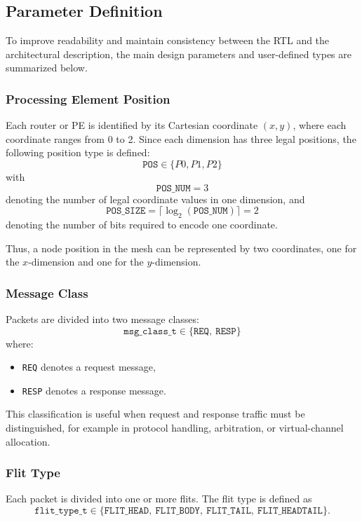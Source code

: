 \documentclass[11pt,a4paper]{article}
\begin{document}
\subsection{Parameter Definition}
\label{subsec:parameter_definition}

To improve readability and maintain consistency between the RTL and the architectural description, the main design parameters and user-defined types are summarized below.

\subsubsection*{Processing Element Position}
Each router or PE is identified by its Cartesian coordinate \((x,y)\), where each coordinate ranges from 0 to 2. Since each dimension has three legal positions, the following position type is defined:
\[
\texttt{POS} \in \{P0, P1, P2\}
\]
with
\[
\texttt{POS\_NUM} = 3
\]
denoting the number of legal coordinate values in one dimension, and
\[
\texttt{POS\_SIZE} = \lceil \log_2(\texttt{POS\_NUM}) \rceil = 2
\]
denoting the number of bits required to encode one coordinate.

Thus, a node position in the mesh can be represented by two coordinates, one for the \(x\)-dimension and one for the \(y\)-dimension.

\subsubsection*{Message Class}
Packets are divided into two message classes:
\[
\texttt{msg\_class\_t} \in \{\texttt{REQ},\ \texttt{RESP}\}
\]
where:
\begin{itemize}
    \item \texttt{REQ} denotes a request message,
    \item \texttt{RESP} denotes a response message.
\end{itemize}

This classification is useful when request and response traffic must be distinguished, for example in protocol handling, arbitration, or virtual-channel allocation.

\subsubsection*{Flit Type}
Each packet is divided into one or more flits. The flit type is defined as
\[
\texttt{flit\_type\_t} \in 
\{\texttt{FLIT\_HEAD},\ \texttt{FLIT\_BODY},\ \texttt{FLIT\_TAIL},\ \texttt{FLIT\_HEADTAIL}\}.
\]
\end{document}
